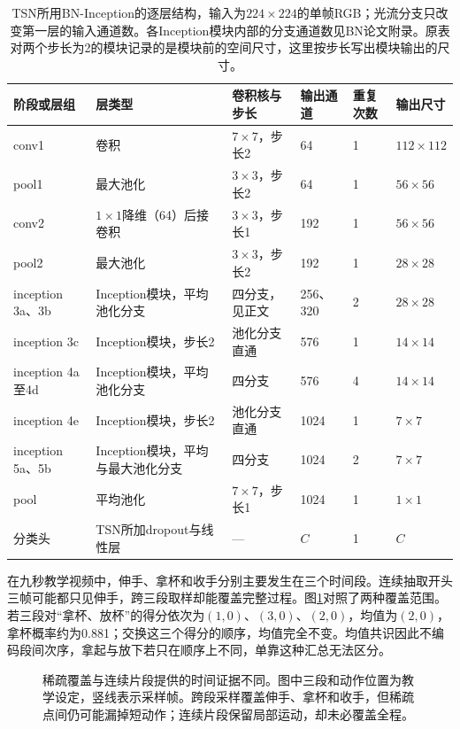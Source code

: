 \begin{table}[tbp]
  \centering
  \small
  \begin{tabularx}{\linewidth}{@{}llXlll@{}}
    \toprule
    阶段或层组 & 层类型 & 卷积核与步长 & 输出通道 & 重复次数 & 输出尺寸\\
    \midrule
    conv1 & 卷积 & $7\times7$，步长2 & 64 & 1 & $112\times112$\\
    pool1 & 最大池化 & $3\times3$，步长2 & 64 & 1 & $56\times56$\\
    conv2 & $1\times1$降维（64）后接卷积 & $3\times3$，步长1 & 192 & 1 & $56\times56$\\
    pool2 & 最大池化 & $3\times3$，步长2 & 192 & 1 & $28\times28$\\
    inception 3a、3b & Inception模块，平均池化分支 & 四分支，见正文 & 256、320 & 2 & $28\times28$\\
    inception 3c & Inception模块，步长2 & 池化分支直通 & 576 & 1 & $14\times14$\\
    inception 4a至4d & Inception模块，平均池化分支 & 四分支 & 576 & 4 & $14\times14$\\
    inception 4e & Inception模块，步长2 & 池化分支直通 & 1024 & 1 & $7\times7$\\
    inception 5a、5b & Inception模块，平均与最大池化分支 & 四分支 & 1024 & 2 & $7\times7$\\
    pool & 平均池化 & $7\times7$，步长1 & 1024 & 1 & $1\times1$\\
    分类头 & TSN所加dropout与线性层 & — & $C$ & 1 & $C$\\
    \bottomrule
  \end{tabularx}
  \caption{TSN所用BN-Inception的逐层结构，输入为$224\times224$的单帧RGB；光流分支只改变第一层的输入通道数。各Inception模块内部的分支通道数见BN论文附录。原表对两个步长为2的模块记录的是模块前的空间尺寸，这里按步长写出模块输出的尺寸。}
  \label{tab:vision-video-bninception}
\end{table}

在九秒教学视频中，伸手、拿杯和收手分别主要发生在三个时间段。连续抽取开头三帧可能都只见伸手，跨三段取样却能覆盖完整过程。图\ref{fig:vision-temporal-sampling}对照了两种覆盖范围。若三段对“拿杯、放杯”的得分依次为$(1,0)$、$(3,0)$、$(2,0)$，均值为$(2,0)$，拿杯概率约为0.881；交换这三个得分的顺序，均值完全不变。均值共识因此不编码段间次序，拿起与放下若只在顺序上不同，单靠这种汇总无法区分。

\begin{figure}[htbp]
  \centering
  
  \caption{稀疏覆盖与连续片段提供的时间证据不同。图中三段和动作位置为教学设定，竖线表示采样帧。跨段采样覆盖伸手、拿杯和收手，但稀疏点间仍可能漏掉短动作；连续片段保留局部运动，却未必覆盖全程。}
  \label{fig:vision-temporal-sampling}
\end{figure}

